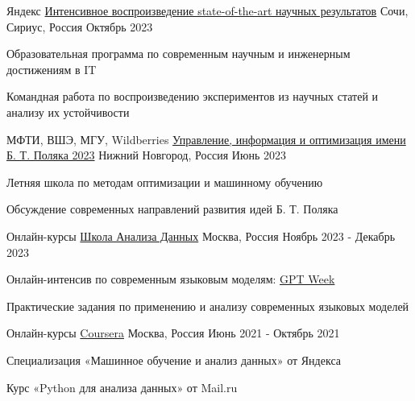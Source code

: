 \begin{cventries}
\cventry
    {Яндекс} %
    {\href{https://education.yandex.ru/sirius/sota}{Интенсивное воспроизведение state-of-the-art научных результатов}} %
    {Сочи, Сириус, Россия} %
    {Октябрь 2023} %
    {
      \begin{cvitems} %
        \item {Образовательная программа по современным научным и инженерным достижениям в IT}
        \item {Командная работа по воспроизведению экспериментов из научных статей и анализу их устойчивости}
      \end{cvitems}
    }

\cventry
    {МФТИ, ВШЭ, МГУ, Wildberries} %
    {\href{http://ssopt.org}{Управление, информация и оптимизация имени Б. Т. Поляка 2023}} %
    {Нижний Новгород, Россия} %
    {Июнь 2023} %
    {
      \begin{cvitems} %
        \item {Летняя школа по методам оптимизации и машинному обучению}
        \item {Обсуждение современных направлений развития идей Б. Т. Поляка}
      \end{cvitems}
    }
\cventry
    {Онлайн-курсы} 
    {\href{https://shad.yandex.ru}{Школа Анализа Данных}}
    {Москва, Россия}
    {Ноябрь 2023 - Декабрь 2023}
    {
      \begin{cvitems}
        \item {Онлайн-интенсив по современным языковым моделям: \href{https://shad.yandex.ru/gptweek}{GPT Week}}
        \item {Практические задания по применению и анализу современных языковых моделей}
      \end{cvitems}
    }

  \cventry
    {Онлайн-курсы} 
    {\href{https://www.coursera.org}{Coursera}}
    {Москва, Россия}
    {Июнь 2021 - Октябрь 2021}
    {
      \begin{cvitems}
        \item {Специализация «Машинное обучение и анализ данных» от Яндекса}
      \item {Курс «Python для анализа данных» от Mail.ru}
      \end{cvitems}
    }

\end{cventries}
